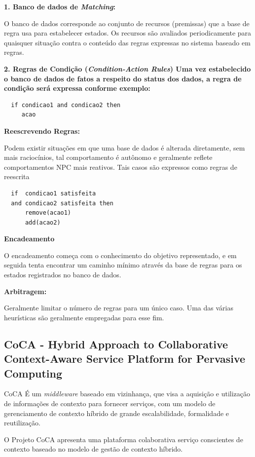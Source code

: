 \documentclass[12pt,a4paper,compsoc]{IEEEtran}
\begin{document}
  \textbf{1. Banco de dados de \textit{Matching}:}

  O banco de dados corresponde ao conjunto de recursos (premissas) que a base de regra usa para
  estabelecer estados. Os recursos são avaliados periodicamente para quaisquer situação contra o
  conteúdo das regras expressas no sistema baseado em regras.

  \textbf{2. Regras de Condição (\textit{Condition-Action Rules}) Uma vez estabelecido o banco de
  dados de fatos a respeito do status dos dados, a regra de condição será expressa conforme exemplo:}

  \begin{lstlisting}
  if condicao1 and condicao2 then
     acao
  \end{lstlisting}

  \textbf{Reescrevendo Regras:}

  Podem existir situações em que uma base de dados é alterada diretamente, sem mais raciocínios,
  tal comportamento é autônomo e geralmente reflete comportamentos NPC mais reativos. Tais casos
  são expressos como regras de reescrita 

  \begin{lstlisting}
  if  condicao1 satisfeita
  and condicao2 satisfeita then
      remove(acao1)
      add(acao2)
  \end{lstlisting}

  \textbf{Encadeamento}
  
  O encadeamento  começa com o conhecimento do objetivo  representado, e em seguida tenta encontrar
  um caminho mínimo através da base de regras para os estados registrados no banco de dados.
  
  \textbf{Arbitragem:}
  
  Geralmente limitar o número de regras para um único caso. Uma das várias heurísticas são 
  geralmente empregadas para esse fim.


\subsection{CoCA - Hybrid Approach to Collaborative Context-Aware Service Platform for Pervasive
 Computing}

  CoCA É um \textit{middleware} baseado em vizinhança, que visa a aquisição e utilização de
  informações de contexto para fornecer serviços, com um modelo de gerenciamento de contexto híbrido
  de grande escalabilidade, formalidade e reutilização.
  
  O Projeto CoCA \cite{ejigu2008hybrid} apresenta uma plataforma colaborativa serviço conscientes
  de contexto baseado no modelo de gestão de contexto híbrido.
  
\end{document}
